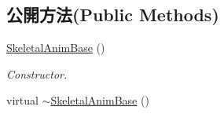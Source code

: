 \subsection*{公開方法(Public Methods)}
\begin{DoxyCompactItemize}
\item 
\hyperlink{class_magnum_1_1_skeletal_anim_base_a41b847c7e94a02cf2184ed55ec294d72}{Skeletal\+Anim\+Base} ()\hypertarget{class_magnum_1_1_skeletal_anim_base_a41b847c7e94a02cf2184ed55ec294d72}{}\label{class_magnum_1_1_skeletal_anim_base_a41b847c7e94a02cf2184ed55ec294d72}

\begin{DoxyCompactList}\small\item\em Constructor. \end{DoxyCompactList}\item 
virtual \hyperlink{class_magnum_1_1_skeletal_anim_base_a26c385908716fbb8faf765c8294933b7}{$\sim$\+Skeletal\+Anim\+Base} ()\hypertarget{class_magnum_1_1_skeletal_anim_base_a26c385908716fbb8faf765c8294933b7}{}\label{class_magnum_1_1_skeletal_anim_base_a26c385908716fbb8faf765c8294933b7}


\end{DoxyCompactItemize}
